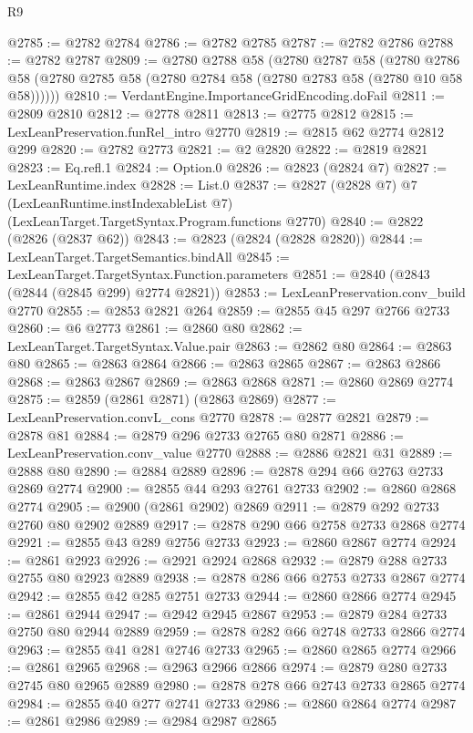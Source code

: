\begin{lexlean}{R9}
\begin{coremodule}
@2785 := @2782 @2784
@2786 := @2782 @2785
@2787 := @2782 @2786
@2788 := @2782 @2787
@2809 := @2780
    @2788
    @58
    (@2780
      @2787
      @58
      (@2780 @2786 @58 (@2780 @2785 @58 (@2780 @2784 @58 (@2780 @2783 @58 (@2780 @10 @58 @58))))))
@2810 := VerdantEngine.ImportanceGridEncoding.doFail
@2811 := @2809 @2810
@2812 := @2778 @2811
@2813 := @2775 @2812
@2815 := LexLeanPreservation.funRel_intro @2770
@2819 := @2815 @62 @2774 @2812 @299
@2820 := @2782 @2773
@2821 := @2 @2820
@2822 := @2819 @2821
@2823 := Eq.refl.{1}
@2824 := Option.{0}
@2826 := @2823 (@2824 @7)
@2827 := LexLeanRuntime.index
@2828 := List.{0}
@2837 := @2827
    (@2828 @7)
    @7
    (LexLeanRuntime.instIndexableList @7)
    (LexLeanTarget.TargetSyntax.Program.functions @2770)
@2840 := @2822 (@2826 (@2837 @62))
@2843 := @2823 (@2824 (@2828 @2820))
@2844 := LexLeanTarget.TargetSemantics.bindAll
@2845 := LexLeanTarget.TargetSyntax.Function.parameters
@2851 := @2840 (@2843 (@2844 (@2845 @299) @2774 @2821))
@2853 := LexLeanPreservation.conv_build @2770
@2855 := @2853 @2821 @264
@2859 := @2855 @45 @297 @2766 @2733
@2860 := @6 @2773
@2861 := @2860 @80
@2862 := LexLeanTarget.TargetSyntax.Value.pair
@2863 := @2862 @80
@2864 := @2863 @80
@2865 := @2863 @2864
@2866 := @2863 @2865
@2867 := @2863 @2866
@2868 := @2863 @2867
@2869 := @2863 @2868
@2871 := @2860 @2869 @2774
@2875 := @2859 (@2861 @2871) (@2863 @2869)
@2877 := LexLeanPreservation.convL_cons @2770
@2878 := @2877 @2821
@2879 := @2878 @81
@2884 := @2879 @296 @2733 @2765 @80 @2871
@2886 := LexLeanPreservation.conv_value @2770
@2888 := @2886 @2821 @31
@2889 := @2888 @80
@2890 := @2884 @2889
@2896 := @2878 @294 @66 @2763 @2733 @2869 @2774
@2900 := @2855 @44 @293 @2761 @2733
@2902 := @2860 @2868 @2774
@2905 := @2900 (@2861 @2902) @2869
@2911 := @2879 @292 @2733 @2760 @80 @2902 @2889
@2917 := @2878 @290 @66 @2758 @2733 @2868 @2774
@2921 := @2855 @43 @289 @2756 @2733
@2923 := @2860 @2867 @2774
@2924 := @2861 @2923
@2926 := @2921 @2924 @2868
@2932 := @2879 @288 @2733 @2755 @80 @2923 @2889
@2938 := @2878 @286 @66 @2753 @2733 @2867 @2774
@2942 := @2855 @42 @285 @2751 @2733
@2944 := @2860 @2866 @2774
@2945 := @2861 @2944
@2947 := @2942 @2945 @2867
@2953 := @2879 @284 @2733 @2750 @80 @2944 @2889
@2959 := @2878 @282 @66 @2748 @2733 @2866 @2774
@2963 := @2855 @41 @281 @2746 @2733
@2965 := @2860 @2865 @2774
@2966 := @2861 @2965
@2968 := @2963 @2966 @2866
@2974 := @2879 @280 @2733 @2745 @80 @2965 @2889
@2980 := @2878 @278 @66 @2743 @2733 @2865 @2774
@2984 := @2855 @40 @277 @2741 @2733
@2986 := @2860 @2864 @2774
@2987 := @2861 @2986
@2989 := @2984 @2987 @2865

\end{coremodule}
\end{lexlean}
